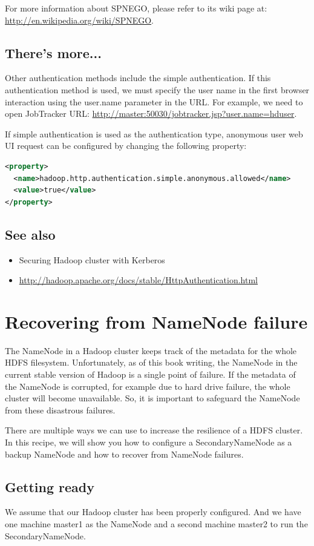 For more information about SPNEGO, please refer to its wiki page at: \url{http://en.wikipedia.org/wiki/SPNEGO}.

\subsection*{There's more...}
Other authentication methods include the simple authentication. If this authentication method is used, we must specify the user name in the first browser interaction using the user.name parameter in the URL. For example, we need to open JobTracker URL: \url{http://master:50030/jobtracker.jsp?user.name=hduser}.

If simple authentication is used as the authentication type, anonymous user web UI request can be configured by changing the following property:
\lstset{style=bashstyle}
\begin{lstlisting}[language=XML]
<property>
  <name>hadoop.http.authentication.simple.anonymous.allowed</name>
  <value>true</value>
</property>
\end{lstlisting}

\subsection*{See also}
\begin{itemize}
  \item Securing Hadoop cluster with Kerberos
  \item \url{http://hadoop.apache.org/docs/stable/HttpAuthentication.html}
\end{itemize}

\section{Recovering from NameNode failure}
The NameNode in a Hadoop cluster keeps track of the metadata for the whole HDFS filesystem. Unfortunately, as of this book writing, the NameNode in the current stable version of Hadoop is a single point of failure. If the metadata of the NameNode is corrupted, for example due to hard drive failure, the whole cluster will become unavailable. So, it is important to safeguard the NameNode from these disastrous failures.

There are multiple ways we can use to increase the resilience of a HDFS cluster. In this recipe, we will show you how to configure a SecondaryNameNode as a backup NameNode and how to recover from NameNode failures.
\subsection*{Getting ready}
We assume that our Hadoop cluster has been properly configured. And we have one machine master1 as the NameNode and a second machine master2 to run the SecondaryNameNode.

